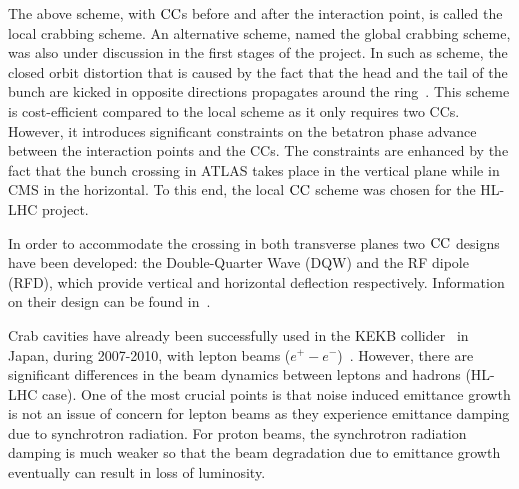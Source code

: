 The above scheme, with ${\mathrm{CC}}$s before and after the interaction point, is called the local crabbing scheme. An alternative scheme, named the global crabbing scheme, was also under discussion in the first stages of the project. In such as scheme, the closed orbit distortion that is caused by the fact that the head and the tail of the bunch are kicked in opposite directions propagates around the ring~\cite{Brning2015}.%
 This scheme is cost-efficient compared to the local scheme as it only requires two CCs. However, it introduces significant constraints on the betatron phase advance between the interaction points and the CCs. The constraints are enhanced by the fact that the bunch crossing in ATLAS takes place in the vertical plane while in CMS in the horizontal. To this end, the local ${\mathrm{CC}}$ scheme was chosen for the HL-LHC project. %

In order to accommodate the crossing in both transverse planes two ${\mathrm{CC}}$ designs have been developed: the Double-Quarter Wave (DQW) and the RF dipole (RFD), which provide vertical and horizontal deflection respectively. Information on their design can be found in~\cite{Zanoni:2288282, DeSilva:2288607, Xiao:1992565, Verdú-Andrés:2113440}.

Crab cavities have already been successfully used in the KEKB collider~\cite{Toge:475260} in Japan, during 2007-2010, with lepton beams ($e^{+} - e^{-}$)~\cite{CC_KEKB_4440798, Funakoshi:1955812, oide:pac07-mozaki01}. However, there are significant differences in the beam dynamics between leptons and hadrons (HL-LHC case). One of the most crucial points is that noise induced emittance growth is not an issue of concern for lepton beams as they experience emittance damping due to synchrotron radiation. For proton beams, the synchrotron radiation damping is much weaker so that the beam degradation due to emittance growth eventually can result in loss of luminosity. %

